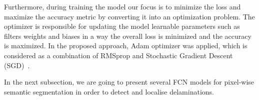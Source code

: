 Furthermore, during training the model our focus is to minimize the loss and maximize the accuracy metric by converting it into an optimization problem. 
The optimizer is responsible for updating the model learnable parameters such as filters weights and biases in a way the overall loss is minimized and the accuracy is maximized.
In the proposed approach, Adam optimizer was applied, which is considered as a combination of RMSprop and Stochastic Gradient Descent (SGD)~\cite{Kingma2015}. 

In the next subsection, we are going to present several FCN models for pixel-wise semantic segmentation in order to detect and localise delaminations.
